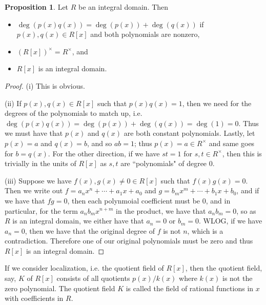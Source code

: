 \documentclass[9pt,reqno]{amsart}
\theoremstyle{definition}
\newtheorem{prop}{Proposition}[section]
\begin{document}
\begin{prop}
	Let $R$ be an integral domain. Then 
	\begin{itemize}
		\item[(i)] $\deg (p(x) q(x)) = \deg (p(x)) + \deg (q(x)) $ if $p(x), q(x) \in R[x]$ and both polynomials are nonzero, 
		\item[(ii)] $(R[x])^\times = R^\times$, and 
		\item[(iii)] $R[x]$ is an integral domain.
	\end{itemize}
\end{prop}
\begin{proof}
	(i) This is obvious.
	
	(ii) If $p(x), q(x) \in R[x]$ such that $p(x) q(x) = 1$, then we need for the degrees of the polynomials to match up, i.e. $\deg( p(x) q(x)) = \deg(p(x)) + \deg (q(x)) = \deg(1) = 0$. Thus we must have that $p(x)$ and $q(x)$ are both constant polynomials. Lastly, let $p(x) =a $ and $q(x) =b$, and so $ab = 1$; thus $p(x) = a \in R^\times$ and same goes for $b= q(x)$. For the other direction, if we have $st = 1$ for $s, t \in R^\times$, then this is trivially in the units of $R[x]$ as $s,t $ are ``polynomials" of degree $0$. 
	
	(iii) Suppose we have $f(x), g(x) \neq 0 \in R[x]$ such that $f(x) g(x) = 0$. Then we write out $f = a_n x^n +\cdots + a_1 x+a_0$ and $g = b_m x^m + \cdots + b_1 x+b_0$, and if we have that $fg =0$, then each polynmoial coefficient must be $0$, and in particular, for the term $a_n b_m x^{n+m}$ in the product, we have that $a_n b_m = 0$, so as $R$ is an integral domain, we either have that  $a_n = 0$ or $b_m = 0$. WLOG, if we have $a_n = 0$, then we have that the original degree of $f$ is not $n$, which is a contradiction. Therefore one of our original polynomials must be zero and thus $R[x]$ is an integral domain. 
\end{proof}

If we consider localization, i.e. the quotient field of $R[x]$, then the quotient field, say, $K$ of $R[x]$ consists of all quotients $p(x)/k(x)$ where $k(x)$ is not the zero polynomial. The quotient field $K$ is called the field of rational functions in $x$ with coefficients in $R$. 
\end{document}
